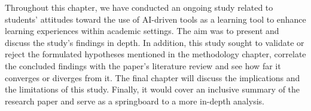 Throughout this chapter, we have conducted an ongoing study related to
students' attitudes toward the use of AI-driven tools as a learning
tool to enhance learning experiences within academic settings. The
aim was to present and discuss the study's findings in depth.
In addition, this study sought to validate or reject the formulated
hypotheses mentioned in the methodology chapter, correlate the
concluded findings with the paper's literature review and see
how far it converges or diverges from it. The final chapter
will discuss the implications and the limitations of this
study. Finally, it would cover an inclusive summary of the
research paper and serve as a springboard to a more in-depth analysis.

 
